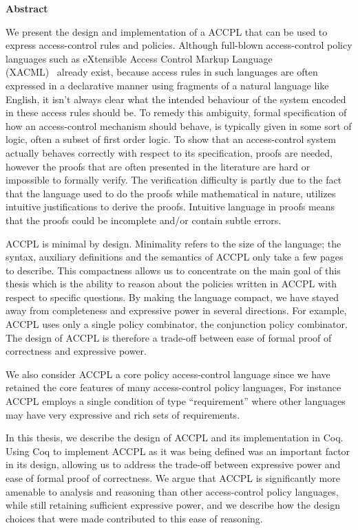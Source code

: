 
\begin{center}\textbf{Abstract}\end{center}

We present the design and implementation of a \ac{ACCPL} that can be used to express access-control rules and policies. Although full-blown access-control policy languages such as eXtensible Access Control Markup Language \\(XACML)~\cite{xacml} already exist, because access rules in such languages are often expressed in a declarative manner using fragments of a natural language like English, it isn't always clear what the intended behaviour of the system encoded in these access rules should be. To remedy this ambiguity, formal specification of how an access-control mechanism should behave, is typically given in some sort of logic, often a subset of first order logic. To show that an access-control system actually behaves correctly with respect to its specification, proofs are needed, however the proofs that are often presented in the literature are hard or impossible to formally verify. The verification difficulty is partly due to the fact that the language used to do the proofs while mathematical in nature, utilizes intuitive justifications to derive the proofs. Intuitive language in proofs means that the proofs could be incomplete and/or contain subtle errors.

\ac{ACCPL} is minimal by design. Minimality refers to the size of the language; the syntax, auxiliary definitions and the semantics of \ac{ACCPL} only take a few pages to describe. This compactness allows us to concentrate on the main goal of this thesis which is the ability to reason about the policies written in \ac{ACCPL} with respect to specific questions. By making the language compact, we have stayed away from completeness and expressive power in several directions. For example, \ac{ACCPL} uses only a single policy combinator, the conjunction policy combinator. The design of \ac{ACCPL} is therefore a trade-off between ease of formal proof of correctness and expressive power.

We also consider \ac{ACCPL} a core policy access-control language since we have retained the core features of many access-control policy languages, For instance \ac{ACCPL} employs a single condition of type ``requirement'' where other languages may have very expressive and rich sets of requirements. 

In this thesis, we describe the design of ACCPL and its implementation in Coq.  Using Coq to implement ACCPL as it was being defined was an important factor in its design, allowing us to address the trade-off between expressive power and ease of formal proof of correctness. We argue that \ac{ACCPL} is significantly more amenable to analysis and reasoning than other access-control policy languages, while still retaining sufficient expressive power, and we describe how the design choices that were made contributed to this ease of reasoning. 

